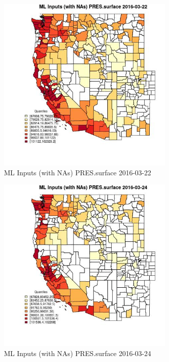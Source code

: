 \clearpage 

\begin{figure} 
\centering  
\includegraphics[width=0.77\textwidth]{Code_Outputs/Report_ML_input_PM25_Step4_part_e_de_duplicated_aveswNAs_CountyPRESsurfaceMean2016-03-22_2016-03-22.jpg} 
\caption{\label{fig:Report_ML_input_PM25_Step4_part_e_de_duplicated_aveswNAsCountyPRESsurfaceMean2016-03-22_2016-03-22}ML Inputs (with NAs) PRES.surface 2016-03-22} 
\end{figure} 
 

\begin{figure} 
\centering  
\includegraphics[width=0.77\textwidth]{Code_Outputs/Report_ML_input_PM25_Step4_part_e_de_duplicated_aveswNAs_CountyPRESsurfaceMean2016-03-24_2016-03-24.jpg} 
\caption{\label{fig:Report_ML_input_PM25_Step4_part_e_de_duplicated_aveswNAsCountyPRESsurfaceMean2016-03-24_2016-03-24}ML Inputs (with NAs) PRES.surface 2016-03-24} 
\end{figure} 
 

